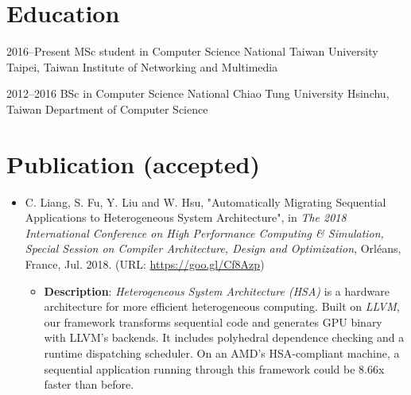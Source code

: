\documentclass[11pt,a4paper,sans,english]{moderncv}
\begin{document}

\makecvtitle

\section{Education}
    \cventry
        {2016--Present} %
        {MSc student in Computer Science} %
        {National Taiwan University} %
        {Taipei, Taiwan} %
        {Institute of Networking and Multimedia} %
        {}

    \cventry
        {2012--2016}
        {BSc in Computer Science}
        {National Chiao Tung University}
        {Hsinchu, Taiwan}
        {Department of Computer Science}
        {%
        }
        
\section{Publication (accepted)}
    \begin{itemize}
    \item C. Liang, S. Fu, Y. Liu and W. Hsu, "Automatically Migrating Sequential Applications to Heterogeneous System Architecture", in \textit{The 2018 International Conference on High Performance Computing \& Simulation, Special Session on Compiler Architecture, Design and Optimization}, Orléans, France, Jul. 2018. (URL: \href{https://goo.gl/Cf8Azp}{https://goo.gl/Cf8Azp})
        \begin{itemize}
        \item \textbf{Description}: \textit{Heterogeneous System Architecture (HSA)} is a hardware architecture for more efficient heterogeneous computing. Built on \textit{LLVM}, our framework transforms sequential code and generates GPU binary with LLVM's backends. It includes polyhedral dependence checking and a runtime dispatching scheduler. On an AMD's HSA-compliant machine, a sequential application running through this framework could be 8.66x faster than before.
        \end{itemize}
    \end{itemize}
    
\end{document}

